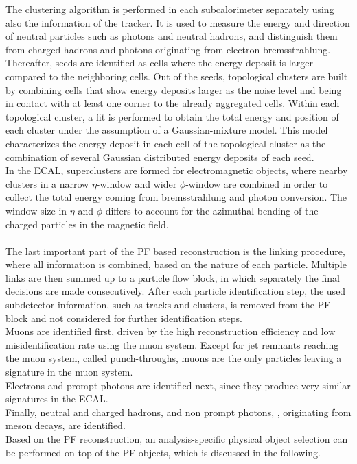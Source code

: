The clustering algorithm is performed in each subcalorimeter separately using also the information of the tracker. It is used to measure the energy and direction of neutral particles such as photons and neutral hadrons, and distinguish them from charged hadrons and photons originating from electron bremsstrahlung. Thereafter, seeds are identified as cells where the energy deposit is larger compared to the neighboring cells. Out of the seeds, topological clusters are built by combining cells that show energy deposits larger as the noise level and being in contact with at least one corner to the already aggregated cells. Within each topological cluster, a fit is performed to obtain the total energy and position of each cluster under the assumption of a Gaussian-mixture model. This model characterizes the energy deposit in each cell of the topological cluster as the combination of several Gaussian distributed energy deposits of each seed.\\
In the ECAL, superclusters are formed for electromagnetic objects, where nearby clusters in a narrow $\eta$-window and wider $\phi$-window are combined in order to collect the total energy coming from bremsstrahlung and photon conversion. The window size in $\eta$ and $\phi$ differs to account for the azimuthal bending of the charged particles in the magnetic field.\\\\
The last important part of the PF based reconstruction is the linking procedure, where all information is combined, based on the nature of each particle. Multiple links are then summed up to a particle flow block, in which separately the final decisions are made consecutively. After each particle identification step, the used subdetector information, such as tracks and clusters, is removed from the PF block and not considered for further identification steps.\\
Muons are identified first, driven by the high reconstruction efficiency and low misidentification rate using the muon system. Except for jet remnants reaching the muon system, called punch-throughs, muons are the only particles leaving a signature in the muon system.\\
Electrons and prompt photons are identified next, since they produce very similar signatures in the ECAL.\\
Finally, neutral and charged hadrons, and non prompt photons, \eg, originating from meson decays, are identified.\\
Based on the PF reconstruction, an analysis-specific physical object selection can be performed on top of the PF objects, which is discussed in the following.
















